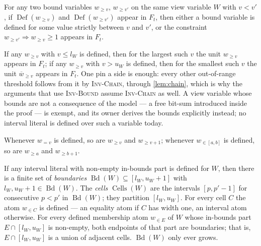 \documentclass[11pt,a4paper]{article}
\theoremstyle{plain}
\theoremstyle{definition}
\theoremstyle{remark}
\newcommand{\fname}[1]{\ensuremath{\operatorname{#1}}}
\newcommand{\Def}{\fname{Def}}
\newcommand{\Cells}{\fname{Cells}}
\newcommand{\Bdry}{\fname{Bd}}
\newcommand{\atge}[2]{#1_{\geq #2}}
\newcommand{\ateq}[2]{#1_{= #2}}
\newcommand{\atin}[3]{#1_{\in[#2,#3]}}
\newcommand{\natge}[2]{\overline{#1}_{\geq #2}}
\newcommand{\atset}[2]{#1_{\in #2}}
\newcommand{\inv}[1]{\textnormal{\textsc{Inv-#1}}}
\newcommand{\invChain}{\inv{Chain}}
\newcommand{\invThresholds}{\inv{Thresholds}}
\newcommand{\invPart}{\inv{Part}}
\begin{document}
\begin{description}[font=\normalfont\bfseries,leftmargin=3.2em,style=nextline]

\item[\invChain{} (thesis Inv1): the order chain.]
  For any two bound variables $\atge{w}{v}$, $\atge{w}{v'}$ on the same
  view variable $W$ with $v<v'$, if $\Def(\atge{w}{v})$ and
  $\Def(\atge{w}{v'})$ appear in $F_t$, then either a bound variable is defined
  for some value strictly between $v$ and $v'$, or the constraint
  $\atge{w}{v'}\Rightarrow\atge{w}{v}\geq 1$ appears in $F_t$.

\item[\inv{Bound}: boundary pins.]
  If any $\atge{w}{v}$ with $v\leq l_W$ is defined, then for the largest such
  $v$ the unit $\atge{w}{v}$ appears in $F_t$; if any $\atge{w}{v}$ with
  $v>u_W$ is defined, then for the smallest such $v$ the unit $\natge{w}{v}$
  appears in $F_t$.  One pin a side is enough: every other out-of-range threshold
  follows from it by \invChain{}, through \cref{lem:chain}, which is why the
  arguments that use \inv{Bound} assume \invChain{} as well.  A view variable
  whose bounds are not a
  consequence of the model --- a free bit-sum introduced inside the proof ---
  is exempt, and its owner derives the bounds explicitly instead; no interval
  literal is defined over such a variable today.

\item[\invThresholds{}: thresholds exist.]
  Whenever $\ateq{w}{v}$ is defined, so are $\atge{w}{v}$ and $\atge{w}{v+1}$;
  whenever $\atin{w}{a}{b}$ is defined, so are $\atge{w}{a}$ and
  $\atge{w}{b+1}$.

\item[\invPart{}: the partition.]
  If any interval literal with non-empty in-bounds part is defined for $W$, then
  there is a finite set of \emph{boundaries} $\Bdry(W)\subseteq[l_W,u_W+1]$ with
  $l_W,u_W+1\in\Bdry(W)$.  The \emph{cells} $\Cells(W)$ are the intervals
  $[p,p'-1]$ for consecutive $p<p'$ in $\Bdry(W)$; they partition $[l_W,u_W]$.
  For every cell $C$ the atom $\atset{w}{C}$ is defined --- an equality atom if
  $C$ has width one, an interval atom otherwise.  For every defined membership atom
  $\atset{w}{E}$ of $W$ whose in-bounds part $E\cap[l_W,u_W]$ is non-empty, both
  endpoints of that part are boundaries; that is, $E\cap[l_W,u_W]$ is a union of
  adjacent cells.  $\Bdry(W)$ only ever grows.


\end{description}
\end{document}
